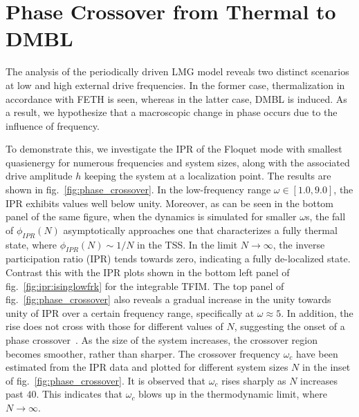 \documentclass[%
reprint,
superscriptaddress,
amsmath,amssymb,
aps,
prb,
showkeys,
]{revtex4-2}
\begin{document}
\section{\label{sec:level5}Phase Crossover from Thermal to DMBL}
The analysis of the periodically driven LMG model reveals two distinct scenarios at low and high external drive frequencies. In the former case, thermalization in accordance with FETH is seen, whereas in the latter case, DMBL is induced. As a result, we hypothesize that a macroscopic change in phase occurs due to the influence of frequency. 

To demonstrate this, we investigate the IPR of the  Floquet mode with smallest quasienergy for numerous frequencies and system sizes, along with the associated drive amplitude $h$ keeping the system at a localization point. The results are shown in fig.~\ref{fig:phase_crossover}. In the low-frequency range $\omega \in \left[1.0, 9.0\right]$, the IPR exhibits values well below unity.   {Moreover, as can be seen in the bottom panel of the same figure, when the dynamics is simulated for smaller} $\omega$s, {the fall of} $\phi_{IPR}(N)$ {asymptotically approaches one that characterizes a fully thermal state, where} $\phi_{IPR}(N)\sim 1/N$ {in the TSS. } In the limit  $N\rightarrow\infty$, the inverse participation ratio (IPR) tends towards zero, indicating a fully de-localized state. Contrast this with the IPR plots shown in the bottom left panel of fig.~\ref{fig:ipr:isinglowfrk} {for the integrable TFIM}.  The top panel of fig.~\ref{fig:phase_crossover} {also reveals} a gradual increase {in the unity} {towards unity} of IPR over a certain frequency range, specifically at $\omega \approx 5$. In addition, the rise does not cross with those for different values of $N$, suggesting the onset of a phase crossover~\cite{sierant_2023, sachdev_quantum_2011}. As the size of the system increases, the crossover region becomes smoother, rather than sharper.  The crossover frequency $\omega_c$ have been estimated from the IPR data and plotted for different system sizes $N$ in the inset of fig.~\ref{fig:phase_crossover}. It is observed that $\omega_c$ rises sharply as $N$ increases past $40$. This indicates that $\omega_c$ blows up in the thermodynamic limit, where $N \to \infty$.
\end{document}
